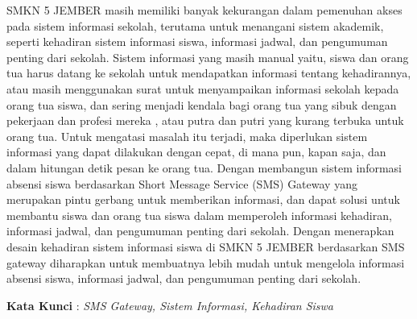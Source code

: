 \documentclass{jtetiproposalskripsi}
\begin{document}
\cover

\approvalpage


\begin{abstractind}
SMKN 5 JEMBER masih memiliki banyak kekurangan dalam pemenuhan akses pada sistem informasi sekolah, terutama untuk menangani sistem akademik, seperti kehadiran sistem informasi siswa, informasi jadwal, dan pengumuman penting dari sekolah. Sistem informasi yang masih manual yaitu, siswa dan orang tua harus datang ke sekolah untuk mendapatkan informasi tentang kehadirannya, atau masih menggunakan surat untuk menyampaikan informasi sekolah kepada orang tua siswa, dan sering menjadi kendala bagi orang tua yang sibuk dengan pekerjaan dan profesi mereka , atau putra dan putri yang kurang terbuka untuk orang tua.
Untuk mengatasi masalah itu terjadi, maka diperlukan sistem informasi yang dapat dilakukan dengan cepat, di mana pun, kapan saja, dan dalam hitungan detik pesan ke orang tua. Dengan membangun sistem informasi absensi siswa berdasarkan Short Message Service (SMS) Gateway yang merupakan pintu gerbang untuk memberikan informasi, dan dapat solusi untuk membantu siswa dan orang tua siswa dalam memperoleh informasi kehadiran, informasi jadwal, dan pengumuman penting dari sekolah.
Dengan menerapkan desain kehadiran sistem informasi siswa di SMKN 5 JEMBER berdasarkan SMS gateway diharapkan untuk membuatnya lebih mudah untuk mengelola informasi absensi siswa, informasi jadwal, dan pengumuman penting dari sekolah.

\begin{flushleft}
\textbf{Kata Kunci} : \textit{SMS Gateway, Sistem Informasi, Kehadiran Siswa}
\end{flushleft}

\bigskip

\end{abstractind}

\tableofcontents
{}
\clearpage{}\setcounter{page}{1}
\end{document}
